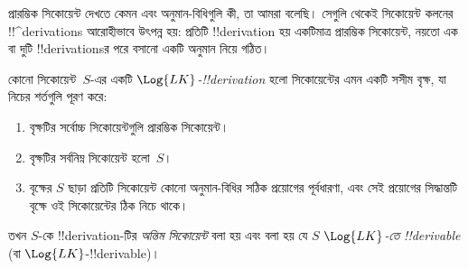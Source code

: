 \documentclass[../../../include/open-logic-section]{subfiles}
\begin{document}
      {}
      {}


\begin{explain}
প্রারম্ভিক সিকোয়েন্ট দেখতে কেমন এবং অনুমান-বিধিগুলি কী, তা আমরা বলেছি।
সেগুলি থেকেই সিকোয়েন্ট কলনের !!^{derivation}s আরোহীভাবে উৎপন্ন হয়:
প্রতিটি !!{derivation} হয় একটিমাত্র প্রারম্ভিক সিকোয়েন্ট, নয়তো এক বা
দুটি !!{derivation}sর পরে বসানো একটি অনুমান নিয়ে গঠিত।
\end{explain}

\begin{defn}
কোনো সিকোয়েন্ট~$S$-এর একটি \emph{$\Log{LK}$-!!{derivation}} হলো
সিকোয়েন্টের এমন একটি সসীম বৃক্ষ, যা নিচের শর্তগুলি পূরণ করে:
\begin{enumerate}
\item বৃক্ষটির সর্বোচ্চ সিকোয়েন্টগুলি প্রারম্ভিক সিকোয়েন্ট।
\item বৃক্ষটির সর্বনিম্ন সিকোয়েন্ট হলো~$S$।
\item বৃক্ষের $S$ ছাড়া প্রতিটি সিকোয়েন্ট কোনো অনুমান-বিধির সঠিক
  প্রয়োগের পূর্বধারণা, এবং সেই প্রয়োগের সিদ্ধান্তটি বৃক্ষে ওই
  সিকোয়েন্টের ঠিক নিচে থাকে।
\end{enumerate}
তখন $S$-কে !!{derivation}-টির \emph{অন্তিম সিকোয়েন্ট} বলা হয় এবং বলা
হয় যে $S$ \emph{$\Log{LK}$-তে !!{derivable}} (বা
$\Log{LK}$-!!{derivable})।
\end{defn}
\end{document}
